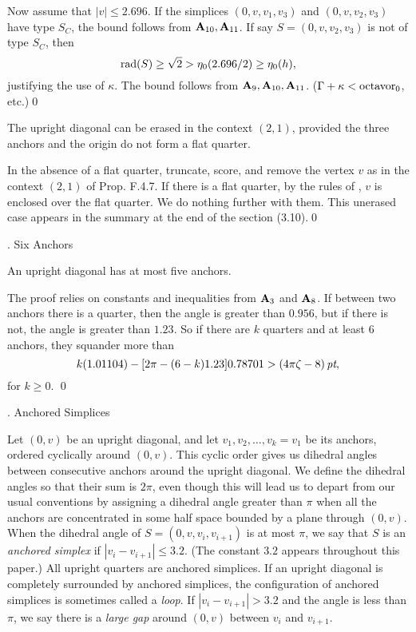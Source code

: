 Now assume that $|v|\le 2.696$.  
 If the
simplices $(0,v,v_1,v_3)$
and $(0,v,v_2,v_3)$ have type $S_C$,
 the bound follows from
${\bold A}_{10},{\bold A}_{11}$.
If say  $S=(0,v,v_2,v_3)$ is not of type $S_C$, then
$$\operatorname{rad}(S)\ge\sqrt2>  \eta_0(2.696/2)\ge\eta_0(h),$$
justifying the use of $\kappa$.
The bound follows from ${\bold A}_9,{\bold A}_{10},{\bold A}_{11}$.
($\Gamma+\kappa <\operatorname{octavor}_0$, etc.)\qed\enddemo

\smallskip

  The upright diagonal can be erased in
the context $(2,1)$, 
 provided the three anchors and the
origin do not form a flat quarter.
\endproclaim

  In the absence of a flat quarter, truncate,
score,
and remove the vertex $v$ as in the context $(2,1)$ of Prop. F.4.7.  If
there is a flat quarter, by the rules of \cite{F}, $v$ is enclosed
over the flat quarter.
We do nothing further with them. This unerased case
appears in the
summary at the end of the section (3.10).\qed
\enddemo

\subhead {}.  Six Anchors\endsubhead

  An upright diagonal has at most five anchors.
\endproclaim

  The proof relies on constants 
and inequalities from ${\bold A}_3$ and ${\bold A}_8$.
If between two anchors there is a quarter, then
the angle is greater than $0.956$, but if there
is not,  the angle is greater than $1.23$.  So if
there are $k$ quarters and at least 6 anchors, they squander more than
	$$ k (1.01104) - [2\pi-(6-k)1.23]0.78701 > (4\pi\zeta-8)\,\hbox{\it pt},$$
for $k\ge0$.
\qed
\enddemo

\subhead {}. Anchored Simplices\endsubhead

Let $(0,v)$ be an upright diagonal, and let $v_1,v_2,\ldots,v_k=v_1$
be its anchors, ordered cyclically around $(0,v)$.  This cyclic
order gives us dihedral angles between consecutive
anchors around the upright diagonal.  We define the dihedral angles
so that their sum is $2\pi$, even though 
this will lead us to depart from our usual conventions by
assigning a dihedral angle greater than $\pi$ when all
the anchors are concentrated in some half space bounded by
a plane through $(0,v)$.  
When the dihedral angle of $S=(0,v,v_i,v_{i+1})$ is at most $\pi$, 
we say that
$S$ is an {\it anchored simplex\/} if $|v_i-v_{i+1}|\le3.2$.
(The constant $3.2$ appears throughout this paper.)
All upright quarters are anchored simplices.
If an upright diagonal is completely surrounded by anchored
simplices, the configuration of anchored simplices
is sometimes called a {\it loop}.
If $|v_i-v_{i+1}|>3.2$ and the angle is less than $\pi$, 
we say there is a {\it large gap\/}
around $(0,v)$ between $v_i$ and $v_{i+1}$.

